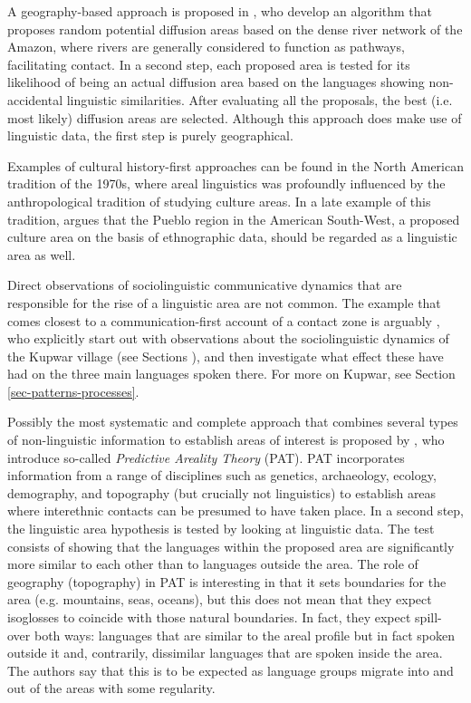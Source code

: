\documentclass[output=paper,
modfonts
]{langscibook}
\begin{document}
A geography-based approach is proposed in \cite{GijnetalForthcRiver}, who develop an algorithm that proposes random potential diffusion areas based on the dense river network of the Amazon, where rivers are generally considered to function as pathways, facilitating contact. In a second step, each proposed area is tested for its likelihood of being an actual diffusion area based on the languages showing non-accidental linguistic similarities. After evaluating all the proposals, the best (i.e. most likely) diffusion areas are selected. Although this approach does make use of linguistic data, the first step is purely geographical.

Examples of cultural history-first approaches can be found in the North American tradition of the 1970s, where areal linguistics was profoundly influenced by the anthropological tradition of studying culture areas. In a late example of this tradition, \cite{Bereznak1995Pueblo} argues that the Pueblo region in the American South-West, a proposed culture area on the basis of ethnographic data, should be regarded as a linguistic area as well.

Direct observations of sociolinguistic communicative dynamics that are responsible for the rise of a linguistic area are not common. The example that comes closest to a communication-first account of a contact zone is arguably \textcite{gumperzetal1971convergence}, who explicitly start out with observations about the sociolinguistic dynamics of the Kupwar village (see Sections ), and then investigate what effect these have had on the three main languages spoken there. For more on Kupwar, see Section \ref{sec-patterns-processes}.

Possibly the most systematic and complete approach that combines several types of non-linguistic information to establish areas of interest is proposed by \cite{Bickeletal2006Oceania}, who introduce so-called \textit{Predictive Areality Theory} (PAT). PAT incorporates information from a range of disciplines such as genetics, archaeology, ecology, demography, and topography (but crucially not linguistics) to establish areas where interethnic contacts can be presumed to have taken place. In a second step, the linguistic area hypothesis is tested by looking at linguistic data. The test consists of showing that the languages within the proposed area are significantly more similar to each other than to languages outside the area. The role of geography (topography) in PAT is interesting in that it sets boundaries for the area (e.g. mountains, seas, oceans), but this does not mean that they expect isoglosses to coincide with those natural boundaries. In fact, they expect spill-over both ways: languages that are similar to the areal profile but in fact spoken outside it and, contrarily, dissimilar languages that are spoken inside the area. The authors say that this is to be expected as language groups migrate into and out of the areas with some regularity.\\
\end{document}
